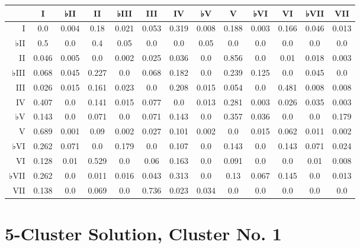 \begin{table}[htbp]
\begin{minipage}{\linewidth}
\setlength{\tymax}{0.5\linewidth}
\centering
\small
\begin{tabulary}{\textwidth}{@{}RCCCCCCCCCCCC@{}} \toprule
&I&♭II&II&♭III&III&IV&♭V&V&♭VI&VI&♭VII&VII\\
\midrule
I&0.0&0.004&0.18&0.021&0.053&0.319&0.008&0.188&0.003&0.166&0.046&0.013\\
♭II&0.5&0.0&0.4&0.05&0.0&0.0&0.05&0.0&0.0&0.0&0.0&0.0\\
II&0.046&0.005&0.0&0.002&0.025&0.036&0.0&0.856&0.0&0.01&0.018&0.003\\
♭III&0.068&0.045&0.227&0.0&0.068&0.182&0.0&0.239&0.125&0.0&0.045&0.0\\
III&0.026&0.015&0.161&0.023&0.0&0.208&0.015&0.054&0.0&0.481&0.008&0.008\\
IV&0.407&0.0&0.141&0.015&0.077&0.0&0.013&0.281&0.003&0.026&0.035&0.003\\
♭V&0.143&0.0&0.071&0.0&0.071&0.143&0.0&0.357&0.036&0.0&0.0&0.179\\
V&0.689&0.001&0.09&0.002&0.027&0.101&0.002&0.0&0.015&0.062&0.011&0.002\\
♭VI&0.262&0.071&0.0&0.179&0.0&0.107&0.0&0.143&0.0&0.143&0.071&0.024\\
VI&0.128&0.01&0.529&0.0&0.06&0.163&0.0&0.091&0.0&0.0&0.01&0.008\\
♭VII&0.262&0.0&0.011&0.016&0.043&0.313&0.0&0.13&0.067&0.145&0.0&0.013\\
VII&0.138&0.0&0.069&0.0&0.736&0.023&0.034&0.0&0.0&0.0&0.0&0.0\\

\bottomrule

\end{tabulary}
\end{minipage}
\end{table}

\section{5-Cluster Solution, Cluster No. 1}
\label{5-clustersolutionclusterno.1}

